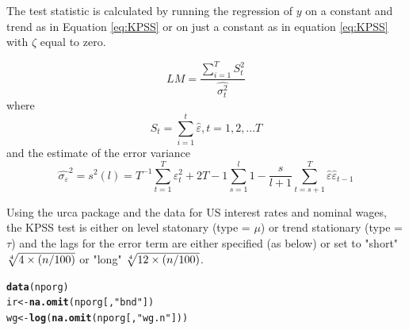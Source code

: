 \documentclass{article}\usepackage{graphicx, color}
\makeatletter
\newcommand{\hlfunctioncall}[1]{\textcolor[rgb]{0.501960784313725,0,0.329411764705882}{\textbf{#1}}}%
\newcommand{\hlstring}[1]{\textcolor[rgb]{0.6,0.6,1}{#1}}%
\newenvironment{kframe}{%
 \def\at@end@of@kframe{}%
 \ifinner\ifhmode%
  \def\at@end@of@kframe{\end{minipage}}%
  \begin{minipage}{\columnwidth}%
 \fi\fi%
 \def\FrameCommand##1{\hskip\@totalleftmargin \hskip-\fboxsep
 \colorbox{shadecolor}{##1}\hskip-\fboxsep
     \hskip-\linewidth \hskip-\@totalleftmargin \hskip\columnwidth}%
 \MakeFramed {\advance\hsize-\width
   \@totalleftmargin\z@ \linewidth\hsize
   \@setminipage}}%
 {\par\unskip\endMakeFramed%
 \at@end@of@kframe}
\newenvironment{knitrout}{}{} %
\makeatother
\begin{document}
The test statistic is calculated by running the regression of $y$ on a constant and trend as in Equation \ref{eq:KPSS} or on just a constant as in equation \ref{eq:KPSS} with $\zeta$ equal to zero.    

\begin{equation}
LM = \frac{\sum_{i = 1}^T S_t^2}{\hat{\sigma_t^2}}
\end{equation}
where 
\begin{equation}
S_t = \sum_{i = 1}^t \hat{\varepsilon} , t = 1, 2,...T
\end{equation}
and the estimate of the error variance
\begin{equation}
\hat{\sigma_{\varepsilon}}^2 = s^2 (l) = T^{-1} \sum_{t=1}^T \varepsilon_t^2 +2T - 1 \sum_{s=1}^l 1-\frac{s}{l+1} \sum_{t=s+1}^T \hat{\varepsilon} \hat{\varepsilon}_{t-1}
\end{equation}

Using the urca package and the data for US interest rates and nominal wages, the KPSS test is either on level statonary (type = $\mu$) or trend stationary (type = $\tau$) and the lags for the error term are either specified (as below) or set to "short" $\root 4 \of {4 \times (n/100)}$ or "long" $\root 4 \of {12 \times (n/100)}$.
\begin{knitrout}
\color{fgcolor}\begin{kframe}
\begin{alltt}
\hlfunctioncall{data}(nporg)
ir <- \hlfunctioncall{na.omit}(nporg[, \hlstring{"bnd"}])
wg <- \hlfunctioncall{log}(\hlfunctioncall{na.omit}(nporg[, \hlstring{"wg.n"}]))
\end{alltt}
\end{kframe}
\end{knitrout}
\end{document}
